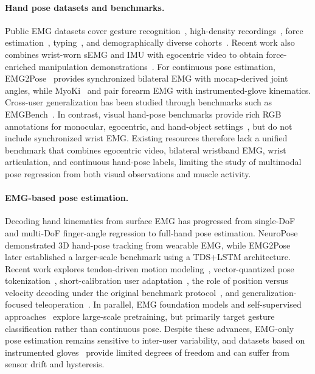 \documentclass[letterpaper]{article} %
\begin{document}
\paragraph{Hand pose datasets and benchmarks.}
Public EMG datasets cover gesture recognition~\citep{ninapro,grabmyo,putemg,du2017surface,amma2015advancing}, high-density recordings~\citep{jiang2021open}, force estimation~\citep{pimforce}, typing~\citep{emg2qwerty}, and demographically diverse cohorts~\citep{gowda2025database}. Recent work also combines wrist-worn sEMG and IMU with egocentric video to obtain force-enriched manipulation demonstrations~\citep{forceband}. For continuous pose estimation, EMG2Pose~\citep{emg2pose} provides synchronized bilateral EMG with mocap-derived joint angles, while MyoKi~\citep{myoki} and \citet{jarque2019} pair forearm EMG with instrumented-glove kinematics. Cross-user generalization has been studied through benchmarks such as EMGBench~\citep{yang2024emgbench}. In contrast, visual hand-pose benchmarks provide rich RGB annotations for monocular, egocentric, and hand-object settings~\citep{freihand,dexycb,interhand,hot3d,h2o,gigahand}, but do not include synchronized wrist EMG. Existing resources therefore lack a unified benchmark that combines egocentric video, bilateral wristband EMG, wrist articulation, and continuous hand-pose labels, limiting the study of multimodal pose regression from both visual observations and muscle activity.

\paragraph{EMG-based pose estimation.}
Decoding hand kinematics from surface EMG has progressed from single-DoF~\citep{ngeo2012continuous,ngeo2014continuous} and multi-DoF finger-angle regression to full-hand pose estimation. NeuroPose~\citep{liu2021neuropose} demonstrated 3D hand-pose tracking from wearable EMG, while EMG2Pose~\citep{emg2pose} later established a larger-scale benchmark using a TDS+LSTM architecture. Recent work explores tendon-driven motion modeling~\citep{emg2tendon}, vector-quantized pose tokenization~\citep{vqmyopose}, short-calibration user adaptation~\citep{react2026}, the role of position versus velocity decoding under the original benchmark protocol~\citep{hadidi2026reevaluating}, and generalization-focused teleoperation~\citep{zhao2026dexemg}. In parallel, EMG foundation models and self-supervised approaches~\citep{fasulo2025tinymyo,mehlman2025scaling,vicregemg,mast} explore large-scale pretraining, but primarily target gesture classification rather than continuous pose. Despite these advances, EMG-only pose estimation remains sensitive to inter-user variability, and datasets based on instrumented gloves~\citep{myoki,jarque2019} provide limited degrees of freedom and can suffer from sensor drift and hysteresis.
\end{document}
